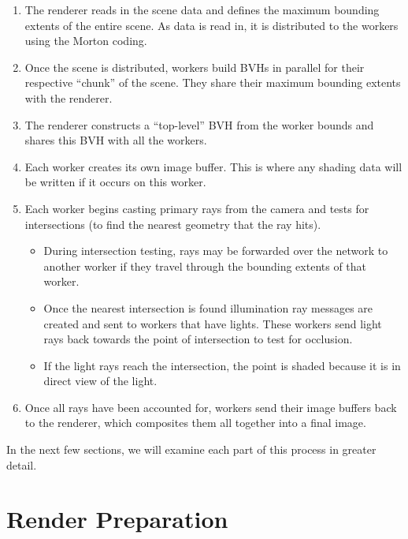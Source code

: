 \documentclass[12pt]{ucthesis}
\begin{document}
\begin{enumerate}
    \item The renderer reads in the scene data and defines the maximum bounding
        extents of the entire scene. As data is read in, it is distributed to
        the workers using the Morton coding.
    \item Once the scene is distributed, workers build BVHs in parallel for
        their respective ``chunk'' of the scene. They share their maximum bounding
        extents with the renderer.
    \item The renderer constructs a ``top-level'' BVH from the worker bounds and
        shares this BVH with all the workers.
    \item Each worker creates its own image buffer. This is where any shading
        data will be written if it occurs on this worker.
    \item Each worker begins casting primary rays from the camera and tests for
        intersections (to find the nearest geometry that the ray hits).
        \begin{itemize}
            \item During intersection testing, rays may be forwarded over the
                network to another worker if they travel through the bounding
                extents of that worker.
            \item Once the nearest intersection is found illumination ray messages are
                created and sent to workers that have lights. These workers
                send light rays back towards the point of intersection to test
                for occlusion.
            \item If the light rays reach the intersection, the point is shaded
                because it is in direct view of the light.
        \end{itemize}
    \item Once all rays have been accounted for, workers send their image
        buffers back to the renderer, which composites them all together into
        a final image.
\end{enumerate}

In the next few sections, we will examine each part of this process in greater
detail.

\section{Render Preparation}
\label{prep}
\end{document}

